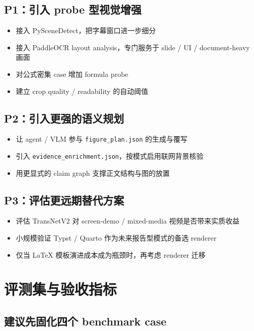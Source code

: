 \documentclass[a4paper]{article}
\begin{document}
\subsection{P1：引入 probe 型视觉增强}

\begin{itemize}
\item 接入 PySceneDetect，把字幕窗口进一步细分
\item 接入 PaddleOCR layout analysis，专门服务于 slide / UI / document-heavy 画面
\item 对公式密集 case 增加 formula probe
\item 建立 crop quality / readability 的自动阈值
\end{itemize}

\subsection{P2：引入更强的语义规划}

\begin{itemize}
\item 让 agent / VLM 参与 \texttt{figure\_plan.json} 的生成与覆写
\item 引入 \texttt{evidence\_enrichment.json}，按模式启用联网背景核验
\item 用更显式的 claim graph 支撑正文结构与图的放置
\end{itemize}

\subsection{P3：评估更远期替代方案}

\begin{itemize}
\item 评估 TransNetV2 对 screen-demo / mixed-media 视频是否带来实质收益
\item 小规模验证 Typst / Quarto 作为未来报告型模式的备选 renderer
\item 仅当 LaTeX 模板演进成本成为瓶颈时，再考虑 renderer 迁移
\end{itemize}

\section{评测集与验收指标}

\subsection{建议先固化四个 benchmark case}
\end{document}
